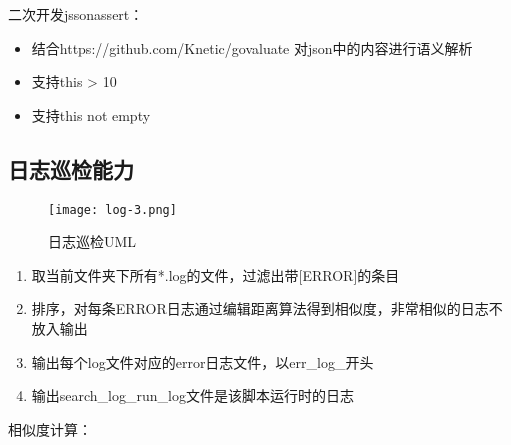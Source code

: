二次开发jssonassert：
\begin{itemize}
    \item 结合https://github.com/Knetic/govaluate 对json中的内容进行语义解析
    \item 支持this > 10
    \item 支持this not empty
\end{itemize}


\subsection{日志巡检能力}

\begin{figure}[H]
    \centering
    \texttt{[image: log-3.png]}
    \caption{日志巡检UML}
    \label{fig:日志巡检UML}
\end{figure}

\begin{enumerate}
    \item 取当前文件夹下所有*.log的文件，过滤出带[ERROR]的条目
    \item 排序，对每条ERROR日志通过编辑距离算法得到相似度，非常相似的日志不放入输出
    \item 输出每个log文件对应的error日志文件，以err\_log\_开头
    \item 输出search\_log\_run\_log文件是该脚本运行时的日志
\end{enumerate}

相似度计算：
%

